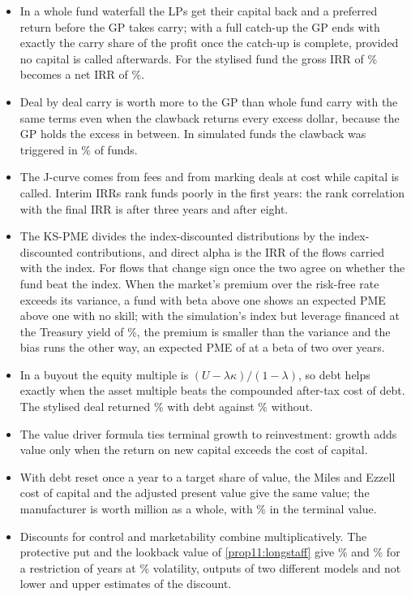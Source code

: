 \begin{chapterrefs}
\begin{itemize}
  \item In a whole fund waterfall the LPs get their capital back and a preferred return before the GP
        takes carry; with a full catch-up the GP ends with exactly the carry share of the profit once
        the catch-up is complete, provided no capital is called afterwards. For the stylised fund the gross IRR of \wfGrossIrr\% becomes a net
        IRR of \wfNetIrr\%.
  \item Deal by deal carry is worth more to the GP than whole fund carry with the same terms even when
        the clawback returns every excess dollar, because the GP holds the excess in between. In
        simulated funds the clawback was triggered in \wfTmClawFreq\% of funds.
  \item The J-curve comes from fees and from marking deals at cost while capital is called. Interim
        IRRs rank funds poorly in the first years: the rank correlation with the final IRR is
        \jcRankThree{} after three years and \jcRankEight{} after eight.
  \item The KS-PME divides the index-discounted distributions by the index-discounted contributions,
        and direct alpha is the IRR of the flows carried with the index. For flows that change sign
        once the two agree on whether the fund beat the index. When the market's premium over the risk-free rate
        exceeds its variance, a fund with beta above one shows an expected PME above one with no skill;
        with the simulation's index but leverage financed at the Treasury yield of \wkRf\%, the premium is
        smaller than the variance and the bias runs the other way, an expected PME of \pkBetaTwo{} at a beta of two over \pkT{} years.
  \item In a buyout the equity multiple is $(U-\lambda \kappa)/(1-\lambda)$, so debt helps exactly when the
        asset multiple beats the compounded after-tax cost of debt. The stylised deal returned \lxIrr\%
        with debt against \lxIrrU\% without.
  \item The value driver formula ties terminal growth to reinvestment: growth adds value only when
        the return on new capital exceeds the cost of capital.
  \item With debt reset once a year to a target share of value, the Miles and Ezzell cost of capital
        and the adjusted present value give the same value; the manufacturer is worth \vlEv{} million as
        a whole, with \vlTvShare\% in the terminal value.
  \item Discounts for control and marketability combine multiplicatively. The protective put and
        the lookback value of \cref{prop11:longstaff} give \dmChaffe\% and \dmLong\% for a restriction of
        \dmT{} years at \dmSig\% volatility, outputs of two different models and not lower and upper
        estimates of the discount.
\end{itemize}


\end{chapterrefs}
